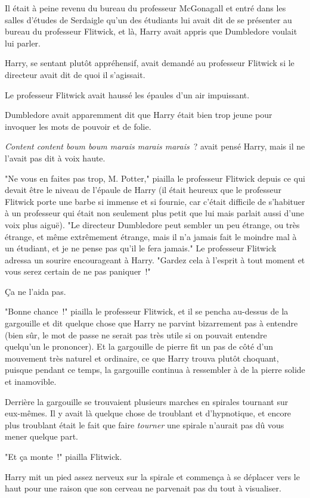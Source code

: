 Il était à peine revenu du bureau du professeur McGonagall et entré dans les salles d'études de Serdaigle qu'un des étudiants lui avait dit de se présenter au bureau du professeur Flitwick, et là, Harry avait appris que Dumbledore voulait lui parler.

Harry, se sentant plutôt appréhensif, avait demandé au professeur Flitwick si le directeur avait dit de quoi il s'agissait.

Le professeur Flitwick avait haussé les épaules d'un air impuissant.

Dumbledore avait apparemment dit que Harry était bien trop jeune pour invoquer les mots de pouvoir et de folie.

\emph{Content content boum boum marais marais marais}~? avait pensé Harry, mais il ne l'avait pas dit à voix haute.

"Ne vous en faites pas trop, M. Potter," piailla le professeur Flitwick depuis ce qui devait être le niveau de l'épaule de Harry (il était heureux que le professeur Flitwick porte une barbe si immense et si fournie, car c'était difficile de s'habituer à un professeur qui était non seulement plus petit que lui mais parlait aussi d'une voix plus aiguë). "Le directeur Dumbledore peut sembler un peu étrange, ou très étrange, et même extrêmement étrange, mais il n'a jamais fait le moindre mal à un étudiant, et je ne pense pas qu'il le fera jamais." Le professeur Flitwick adressa un sourire encourageant à Harry. "Gardez cela à l'esprit à tout moment et vous serez certain de ne pas paniquer~!"

Ça ne l'aida pas.

"Bonne chance~!" piailla le professeur Flitwick, et il se pencha au-dessus de la gargouille et dit quelque chose que Harry ne parvint bizarrement pas à entendre (bien sûr, le mot de passe ne serait pas très utile si on pouvait entendre quelqu'un le prononcer). Et la gargouille de pierre fit un pas de côté d'un mouvement très naturel et ordinaire, ce que Harry trouva plutôt choquant, puisque pendant ce temps, la gargouille continua à ressembler à de la pierre solide et inamovible.

Derrière la gargouille se trouvaient plusieurs marches en spirales tournant sur eux-mêmes. Il y avait là quelque chose de troublant et d'hypnotique, et encore plus troublant était le fait que faire \emph{tourner} une spirale n'aurait pas dû vous mener quelque part.

"Et ça monte~!" piailla Flitwick.

Harry mit un pied assez nerveux sur la spirale et commença à se déplacer vers le haut pour une raison que son cerveau ne parvenait pas du tout à visualiser.

